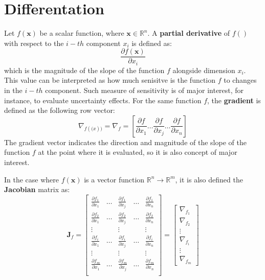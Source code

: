 
\section{Differentation}

Let $f(\mathbf{x})$ be a scalar function, where $\mathbf{x} \in \mathbb{R}^n$. A \textbf{partial derivative} of $f()$ with respect to the $i-th$ component $x_i$ is defined as: 
\begin{equation}
 \frac{\partial f(\mathbf{x}) }{\partial x_i}
\end{equation}
which is the magnitude of the slope of the function $f$ alongside dimension $x_i$. This value can be interpreted as how much senisitve is the function $f$ to changes in the $i-th$ component. Such measure of sensitivity is of major interest, for instance, to evaluate uncertainty effects. For the same function $f$, the \textbf{gradient} is defined as the following row vector:
\begin{equation}
 \nabla_{f(\mathbf(x))} = \nabla_f = \left[
    \frac{\partial f }{\partial x_1} 
    \dots
    \frac{\partial f }{\partial x_j}
    \dots
    \frac{\partial f }{\partial x_n}
    \right]
\end{equation}
The gradient vector indicates the direction and magnitude of the slope of the function $f$ at the point where it is evaluated, so it is also concept of major interest.  

In the case where $f(\mathbf{x})$ is a vector function $\mathbb{R}^n \rightarrow \mathbb{R}^m$, it is also defined the \textbf{Jacobian} matrix as: 
\begin{equation}
 \mathbf{J}_f = 
 \left[
\begin{array}{ccccc}
  \frac{\partial f_1 }{\partial x_1} & \dots & \frac{\partial f_1 }{\partial x_j} & \dots & \frac{\partial f_1 }{\partial x_n} \\
  \frac{\partial f_2 }{\partial x_1} & \dots & \frac{\partial f_2 }{\partial x_j} & \dots & \frac{\partial f_2 }{\partial x_n} \\
  \vdots & & \vdots & & \vdots \\
  \frac{\partial f_i }{\partial x_1} & \dots & \frac{\partial f_i }{\partial x_j} & \dots & \frac{\partial f_i }{\partial x_n} \\
  \vdots & & \vdots & & \vdots \\
  \frac{\partial f_m }{\partial x_1} & \dots & \frac{\partial f_m }{\partial x_j} & \dots & \frac{\partial f_m }{\partial x_n} \\
\end{array}
\right] = 
\left[
\begin{array}{c}
 \nabla_{f_1} \\
 \nabla_{f_2} \\
 \vdots \\
 \nabla_{f_i} \\
 \vdots \\
 \nabla_{f_m}
\end{array}
\right]
\end{equation}

